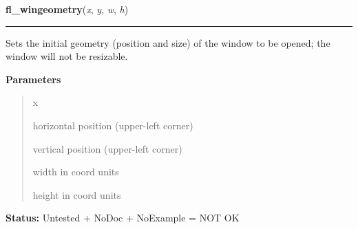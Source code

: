 \hspace{.8\funcindent}\begin{boxedminipage}{\funcwidth}

    \raggedright \textbf{fl\_wingeometry}(\textit{x}, \textit{y}, \textit{w}, \textit{h})

    \vspace{-1.5ex}

    \rule{\textwidth}{0.5\fboxrule}
\setlength{\parskip}{2ex}
    Sets the initial geometry (position and size) of the window to be 
    opened; the window will not be resizable.

\setlength{\parskip}{1ex}
      \textbf{Parameters}
      \vspace{-1ex}

      \begin{quote}
        \begin{Ventry}{x}

          \item[x]

          horizontal position (upper-left corner)

          \item[y]

          vertical position (upper-left corner)

          \item[w]

          width in coord units

          \item[h]

          height in coord units

        \end{Ventry}

      \end{quote}

\textbf{Status:} Untested + NoDoc + NoExample = NOT OK



    \end{boxedminipage}

    \label{xformslib:library:fl_wingeometry}

    \vspace{0.5ex}

